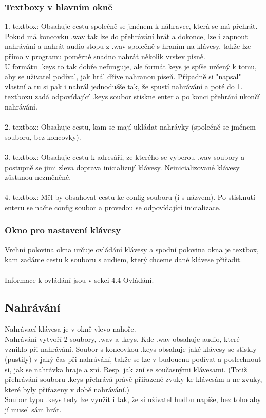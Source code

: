 \documentclass[12pt]{article}
\begin{document}
	\subsubsection{Textboxy v hlavním okně}
1. textbox: Obsahuje cestu společně se jménem k náhravce, která se má přehrát. Pokud má koncovku .wav tak lze do přehrávání hrát a dokonce, lze i zapnout nahrávání a nahrát audio stopu z .wav společně s hraním na klávesy, takže lze přímo v programu poměrně snadno nahrát několik vrstev písně.
\\
 U formátu .keys to tak dobře nefunguje, ale formát keys je spíše určený k tomu, aby se uživatel podíval, jak hrál dříve nahranou píseň. Případně si "napsal" vlastní a tu si pak i nahrál jednodušše tak, že spustí nahrávání a poté do 1. textboxu zadá odpovídající .keys soubor stiskne enter a po konci přehrání ukončí nahrávání. 
\\
\\
2. textbox: Obsahuje cestu, kam se mají ukládat nahrávky (společně se jménem souboru, bez koncovky).
\\
\\
3. textbox: Obsahuje cestu k adresáři, ze kterého se vyberou .wav soubory a postupně se jimi zleva doprava inicializují klávesy. Neinicializované klávesy zůstanou nezměněné.
\\
\\
4. textbox: Měl by obsahovat cestu ke config souboru (i s názvem). Po stisknutí enteru se načte config soubor a provedou se odpovídající inicializace.

	\subsubsection{Okno pro nastavení klávesy} 
	Vrchní polovina okna určuje ovládání klávesy a spodní polovina okna je textbox, kam zadáme cestu k souboru s audiem, který chceme dané klávese přiřadit.
	\\
	\\
	Informace k ovládání jsou v sekci 4.4 Ovládání.
	
	\newpage
	\subsection{Nahrávání}
	Nahrávací klávesa je v okně vlevo nahoře.
	\\
	Nahrávání vytvoří 2 soubory, .wav a .keys. Kde .wav obsahuje audio, které vzniklo při nahrávání. Soubor s koncovkou .keys obsahuje jaké klávesy se stiskly (pustily) v jaký čas při nahrávání, takže se lze v budoucnu podívat a poslechnout si, jak se nahrávka hraje a zní. Resp. jak zní se současnými klávesami. (Totiž přehrávání souboru .keys přehrává právě přiřazené zvuky ke klávesám a ne zvuky, které byly přiřazeny v době nahrávání.)
	\\
	Soubor typu .keys tedy lze využít i tak, že si uživatel hudbu napíše, bez toho aby jí musel sám hrát. 
	 
\end{document}

